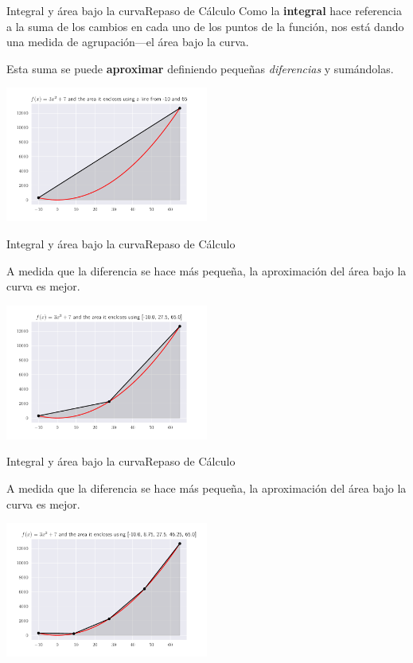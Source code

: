 \documentclass[spanish, c, dvipsnames]{beamer}
\begin{document}
\begin{frame}{Integral y área bajo la curva}{Repaso de Cálculo}
    Como la \textbf{integral} hace referencia a la \alert{suma} de los cambios en cada uno de los puntos de la función, nos está dando una medida de agrupación---el área bajo la curva.

    Esta suma se puede \textbf{aproximar} definiendo pequeñas \textit{diferencias} y sumándolas.

    \begin{center}
        \includegraphics[width=0.5\textwidth]{int01.pdf}
    \end{center}    

\end{frame}

\begin{frame}{Integral y área bajo la curva}{Repaso de Cálculo}

    A medida que la diferencia se hace más pequeña, la aproximación del área bajo la curva es mejor.

    \begin{center}
        \includegraphics[width=0.5\textwidth]{int02.pdf}
    \end{center}    

\end{frame}

\begin{frame}{Integral y área bajo la curva}{Repaso de Cálculo}

    A medida que la diferencia se hace más pequeña, la aproximación del área bajo la curva es mejor.

    \begin{center}
        \includegraphics[width=0.5\textwidth]{int03.pdf}
    \end{center}    

\end{frame}
\end{document}
